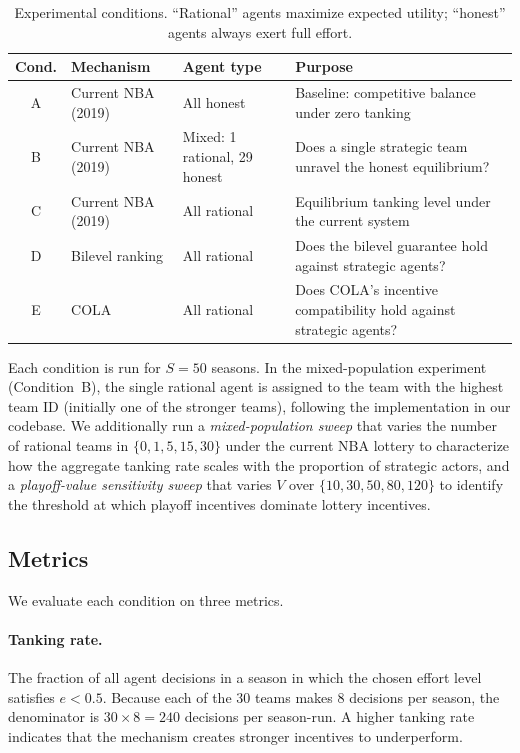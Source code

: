 \begin{table}[h]
\centering
\renewcommand{\arraystretch}{1.3}
\begin{tabular}{cllp{5.5cm}}
\hline
\textbf{Cond.} & \textbf{Mechanism} & \textbf{Agent type} & \textbf{Purpose} \\
\hline
A & Current NBA (2019) & All honest
  & Baseline: competitive balance under zero tanking \\
B & Current NBA (2019) & Mixed: 1 rational, 29 honest
  & Does a single strategic team unravel the honest equilibrium? \\
C & Current NBA (2019) & All rational
  & Equilibrium tanking level under the current system \\
D & Bilevel ranking \citep{kazachkov2020} & All rational
  & Does the bilevel guarantee hold against strategic agents? \\
E & COLA \citep{highley2026} & All rational
  & Does COLA's incentive compatibility hold against strategic agents? \\
\hline
\end{tabular}
\caption{Experimental conditions. ``Rational'' agents maximize expected
utility; ``honest'' agents always exert full effort.}
\label{tab:conditions}
\end{table}

Each condition is run for $S = 50$ seasons.
In the mixed-population experiment (Condition~B), the single rational agent is
assigned to the team with the highest team ID (initially one of the stronger
teams), following the implementation in our codebase.
We additionally run a \emph{mixed-population sweep} that varies the number of
rational teams in $\{0, 1, 5, 15, 30\}$ under the current NBA lottery to
characterize how the aggregate tanking rate scales with the proportion of
strategic actors, and a \emph{playoff-value sensitivity sweep} that varies $V$
over $\{10, 30, 50, 80, 120\}$ to identify the threshold at which playoff
incentives dominate lottery incentives.

\subsection{Metrics}
\label{sec:metrics}

We evaluate each condition on three metrics.

\paragraph{Tanking rate.}
The fraction of all agent decisions in a season in which the chosen effort level
satisfies $e < 0.5$.
Because each of the 30 teams makes 8 decisions per season, the denominator is
$30 \times 8 = 240$ decisions per season-run.
A higher tanking rate indicates that the mechanism creates stronger incentives
to underperform.


